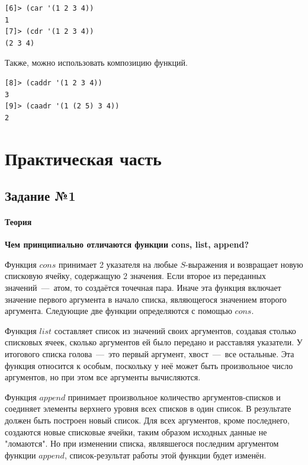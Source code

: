 \begin{code}
\begin{verbatim}
[6]> (car '(1 2 3 4))
1
[7]> (cdr '(1 2 3 4))
(2 3 4)
\end{verbatim}
\end{code}

Также, можно использовать композицию функций.

\begin{code}
\begin{verbatim}
[8]> (caddr '(1 2 3 4))
3
[9]> (caadr '(1 (2 5) 3 4))
2
\end{verbatim}
\end{code}

\newpage

\chapter{Практическая часть}
\section{Задание №1}
\subsubsection{Теория}
\textbf{Чем принципиально отличаются функции cons, list, append?}

Функция $cons$ принимает 2 указателя на любые $S$-выражения и возвращает новую списковую ячейку, содержащую 2 значения. Если второе из переданных значений~---~атом, то создаётся точечная пара. Иначе эта функция включает значение первого аргумента в начало списка, являющегося значением второго аргумента. Следующие две функции определяются с помощью $cons$.

Функция $list$ составляет список из значений своих аргументов, создавая столько списковых ячеек, сколько аргументов ей было передано и расставляя указатели. У итогового списка голова~---~это первый аргумент, хвост~---~все остальные. Эта функция относится к особым, поскольку у неё может быть произвольное число аргументов, но при этом все аргументы вычисляются.

Функция $append$ принимает произвольное количество аргументов-списков и соединяет элементы верхнего уровня всех списков в один список. В результате должен быть построен новый список. Для всех аргументов, кроме последнего, создаются новые списковые ячейки, таким образом исходных данные не "ломаются". Но при изменении списка, являвшегося последним аргументом функции $append$, список-результат работы этой функции будет изменён.

